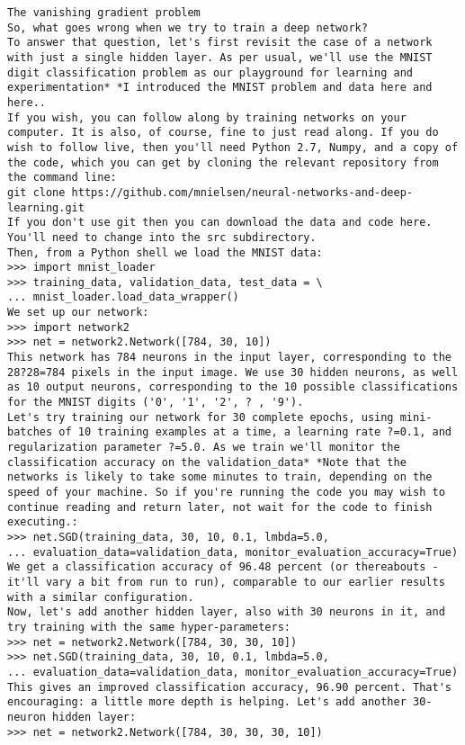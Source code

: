 \begin{lstlisting}
The vanishing gradient problem
So, what goes wrong when we try to train a deep network?
To answer that question, let's first revisit the case of a network with just a single hidden layer. As per usual, we'll use the MNIST digit classification problem as our playground for learning and experimentation* *I introduced the MNIST problem and data here and here..
If you wish, you can follow along by training networks on your computer. It is also, of course, fine to just read along. If you do wish to follow live, then you'll need Python 2.7, Numpy, and a copy of the code, which you can get by cloning the relevant repository from the command line: 
git clone https://github.com/mnielsen/neural-networks-and-deep-learning.git
If you don't use git then you can download the data and code here. You'll need to change into the src subdirectory.
Then, from a Python shell we load the MNIST data:
>>> import mnist_loader
>>> training_data, validation_data, test_data = \
... mnist_loader.load_data_wrapper()
We set up our network:
>>> import network2
>>> net = network2.Network([784, 30, 10])
This network has 784 neurons in the input layer, corresponding to the 28?28=784 pixels in the input image. We use 30 hidden neurons, as well as 10 output neurons, corresponding to the 10 possible classifications for the MNIST digits ('0', '1', '2', ? , '9').
Let's try training our network for 30 complete epochs, using mini-batches of 10 training examples at a time, a learning rate ?=0.1, and regularization parameter ?=5.0. As we train we'll monitor the classification accuracy on the validation_data* *Note that the networks is likely to take some minutes to train, depending on the speed of your machine. So if you're running the code you may wish to continue reading and return later, not wait for the code to finish executing.:
>>> net.SGD(training_data, 30, 10, 0.1, lmbda=5.0, 
... evaluation_data=validation_data, monitor_evaluation_accuracy=True)
We get a classification accuracy of 96.48 percent (or thereabouts - it'll vary a bit from run to run), comparable to our earlier results with a similar configuration.
Now, let's add another hidden layer, also with 30 neurons in it, and try training with the same hyper-parameters:
>>> net = network2.Network([784, 30, 30, 10])
>>> net.SGD(training_data, 30, 10, 0.1, lmbda=5.0, 
... evaluation_data=validation_data, monitor_evaluation_accuracy=True)
This gives an improved classification accuracy, 96.90 percent. That's encouraging: a little more depth is helping. Let's add another 30-neuron hidden layer:
>>> net = network2.Network([784, 30, 30, 30, 10])

\end{lstlisting}
